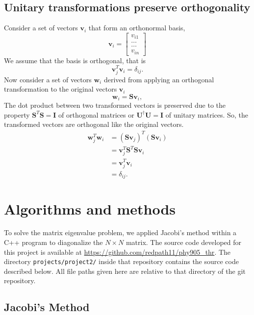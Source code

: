 \documentclass[10pt,showpacs,preprintnumbers,footinbib,amsmath,amssymb,aps,prl,twocolumn,groupedaddress,superscriptaddress,showkeys]{revtex4-1}
\begin{document}
{\subsection{Unitary transformations preserve orthogonality}

Consider a set of vectors $\mathbf{v}_i$ that form an orthonormal basis,
\[
\mathbf{v}_i = \begin{bmatrix} v_{i1} \\ \dots \\ \dots \\v_{in} \end{bmatrix}
\]
We assume that the basis is orthogonal, that is 
\[
\mathbf{v}_j^T\mathbf{v}_i = \delta_{ij}.
\]
Now consider a set of vectors $\mathbf{w}_i$ derived from applying an orthogonal
transformation to the original vectors $\mathbf{v}_i$
\[
\mathbf{w}_i=\mathbf{S}\mathbf{v}_i,
\]
The dot product between two transformed vectors is preserved due to the
property $\mathbf{S}^T \mathbf{S} = \mathbf{I}$ of orthogonal matrices
or $\mathbf{U} ^\dagger \mathbf{U} = \mathbf{I}$ of unitary matrices.
So, the transformed vectors are orthogonal like the original vectors.
\begin{align*}
\mathbf{w}_j^T\mathbf{w}_i &= (\mathbf{S} \mathbf{v}_j)^T (\mathbf{S}\mathbf{v}_i)\\
	&= \mathbf{v}_j ^T \mathbf{S}^T \mathbf{S} \mathbf{v}_i\\
	&= \mathbf{v}_j ^T \mathbf{v}_i\\
	&= \delta_{ij}.
\end{align*}

\section{Algorithms and methods}

To solve the matrix eigenvalue problem, we applied Jacobi's method within a
C++ program to diagonalize the $N \times N$ matrix. The source code developed
for this project is available at \url{https://github.com/redpath11/phy905_thr}.
The directory \texttt{projects/project2/} inside that repository contains the
source code described below. All file paths given here are relative to that
directory of the git repository.

\subsection{Jacobi's Method}


}
\end{document}
